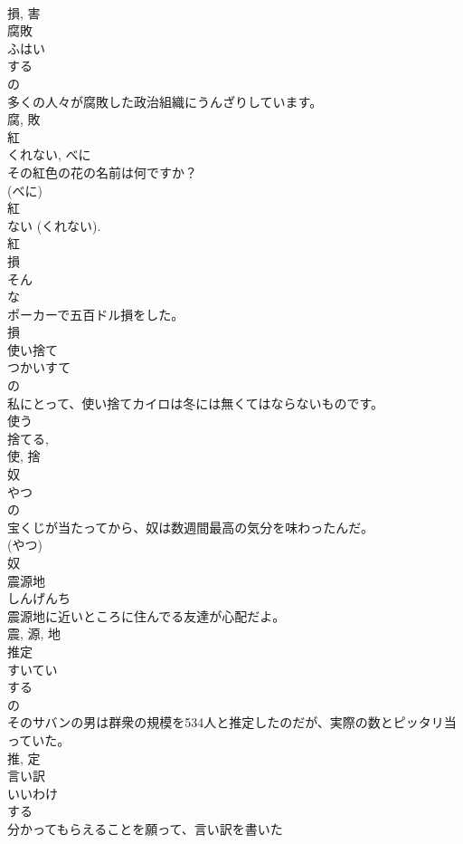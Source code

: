 \documentclass[8pt]{extreport}
\begin{document}
\begin{CJK}{UTF8}{min}
\\	損, 害	
\\	腐敗	
\\	ふはい	
\\	する 
\\	の 
\\	多くの人々が腐敗した政治組織にうんざりしています。	
\\	腐, 敗	
\\	紅	
\\	くれない, べに	
\\	その紅色の花の名前は何ですか？	
\\	(べに) 
\\	紅 
\\	ない (くれない). 
\\	紅	
\\	損	
\\	そん	
\\	な 
\\	ポーカーで五百ドル損をした。	
\\	損	
\\	使い捨て	
\\	つかいすて	
\\	の 
\\	私にとって、使い捨てカイロは冬には無くてはならないものです。	
\\	使う 
\\	捨てる, 
\\	使, 捨	
\\	奴	
\\	やつ	
\\	の 
\\	宝くじが当たってから、奴は数週間最高の気分を味わったんだ。	
\\	(やつ) 
\\	奴	
\\	震源地	
\\	しんげんち	
\\	震源地に近いところに住んでる友達が心配だよ。	
\\	震, 源, 地	
\\	推定	
\\	すいてい	
\\	する 
\\	の 
\\	そのサバンの男は群衆の規模を534人と推定したのだが、実際の数とピッタリ当っていた。	
\\	推, 定	
\\	言い訳	
\\	いいわけ	
\\	する 
\\	分かってもらえることを願って、言い訳を書いた

\end{CJK}
\end{document}
